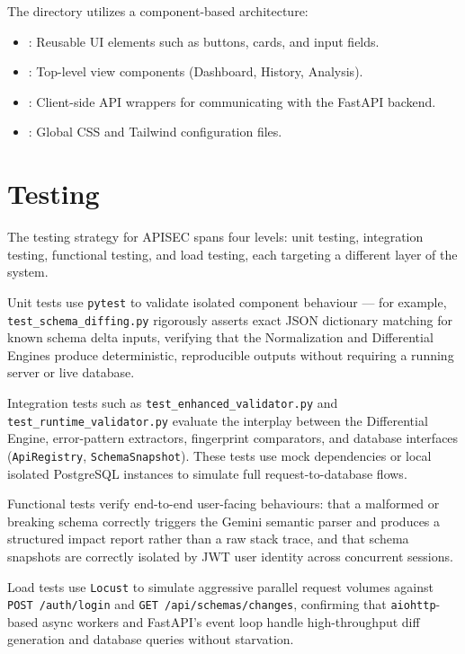 \documentclass{fisatprojectfinal}
\begin{document}
The  directory utilizes a component-based architecture:
\begin{itemize}
    \item {}: Reusable UI elements such as buttons, cards, and input fields.
    \item {}: Top-level view components (Dashboard, History, Analysis).
    \item {}: Client-side API wrappers for communicating with the FastAPI backend.
    \item {}: Global CSS and Tailwind configuration files.
\end{itemize}


\chapter{Testing}
The testing strategy for APISEC spans four levels: unit testing, integration testing, functional testing, and load testing, each targeting a different layer of the system.

Unit tests use \texttt{pytest} to validate isolated component behaviour — for example, \texttt{test\_schema\_diffing.py} rigorously asserts exact JSON dictionary matching for known schema delta inputs, verifying that the Normalization and Differential Engines produce deterministic, reproducible outputs without requiring a running server or live database.

Integration tests such as \texttt{test\_enhanced\_validator.py} and \texttt{test\_runtime\_validator.py} evaluate the interplay between the Differential Engine, error-pattern extractors, fingerprint comparators, and database interfaces (\texttt{ApiRegistry}, \texttt{SchemaSnapshot}). These tests use mock dependencies or local isolated PostgreSQL instances to simulate full request-to-database flows.

Functional tests verify end-to-end user-facing behaviours: that a malformed or breaking schema correctly triggers the Gemini semantic parser and produces a structured impact report rather than a raw stack trace, and that schema snapshots are correctly isolated by JWT user identity across concurrent sessions.

Load tests use \texttt{Locust} to simulate aggressive parallel request volumes against \texttt{POST /auth/login} and \texttt{GET /api/schemas/changes}, confirming that \texttt{aiohttp}-based async workers and FastAPI's event loop handle high-throughput diff generation and database queries without starvation.
\end{document}
